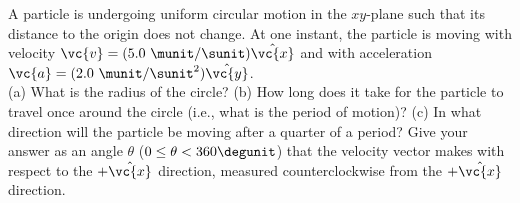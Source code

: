 A particle is undergoing uniform circular motion in the $xy$-plane
such that its distance to the origin does not change. At one instant,
the particle is moving with velocity 
$\vc{v} = (5.0\ \munit/\sunit) \hat{\vc{x}}$
and with acceleration $\vc{a} = (2.0\ \munit/\sunit^2) \hat{\vc{y}}$.\\
%
(a) What is the radius of the circle?\hwendpart
%
(b) How long does it take for the particle to travel once around the
circle (i.e., what is the period of motion)?\hwendpart
%
(c) In what direction will the particle be moving after a quarter of a
period? Give your answer as an angle $\theta$ ($0 \leq \theta <
360\degunit$) that the velocity vector makes with respect to the
$+\hat{\vc{x}}$ direction, measured counterclockwise from the $+\hat{\vc{x}}$
direction.
